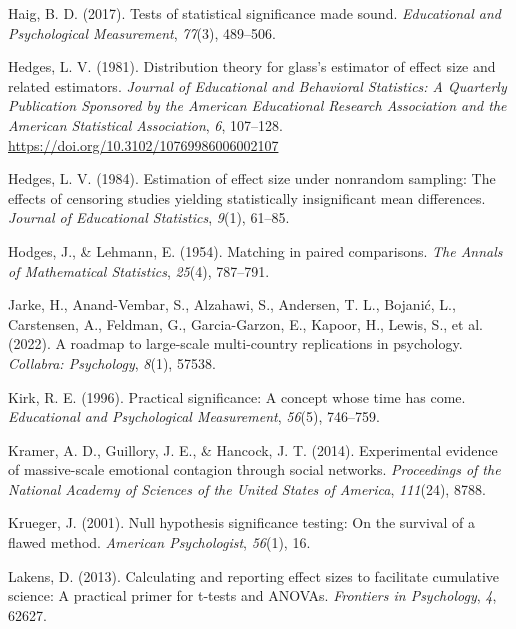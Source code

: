 \documentclass[
  man,floatsintext]{apa7}
\newlength{\cslhangindent}
\newlength{\cslentryspacingunit} %
\newenvironment{CSLReferences}[2] %
 {%
  \setlength{\parindent}{0pt}
  \ifodd #1
  \let\oldpar\par
  \def\par{\hangindent=\cslhangindent\oldpar}
  \fi
  \setlength{\parskip}{#2\cslentryspacingunit}
 }%
 {}
\begin{document}
\begin{CSLReferences}{1}{0}
\leavevmode{}%
Haig, B. D. (2017). Tests of statistical significance made sound. \emph{Educational and Psychological Measurement}, \emph{77}(3), 489--506.

\leavevmode{}%
Hedges, L. V. (1981). Distribution theory for glass's estimator of effect size and related estimators. \emph{Journal of Educational and Behavioral Statistics: A Quarterly Publication Sponsored by the American Educational Research Association and the American Statistical Association}, \emph{6}, 107--128. \url{https://doi.org/10.3102/10769986006002107}

\leavevmode{}%
Hedges, L. V. (1984). Estimation of effect size under nonrandom sampling: The effects of censoring studies yielding statistically insignificant mean differences. \emph{Journal of Educational Statistics}, \emph{9}(1), 61--85.

\leavevmode{}%
Hodges, J., \& Lehmann, E. (1954). Matching in paired comparisons. \emph{The Annals of Mathematical Statistics}, \emph{25}(4), 787--791.

\leavevmode{}%
Jarke, H., Anand-Vembar, S., Alzahawi, S., Andersen, T. L., Bojanić, L., Carstensen, A., Feldman, G., Garcia-Garzon, E., Kapoor, H., Lewis, S., et al. (2022). A roadmap to large-scale multi-country replications in psychology. \emph{Collabra: Psychology}, \emph{8}(1), 57538.

\leavevmode{}%
Kirk, R. E. (1996). Practical significance: A concept whose time has come. \emph{Educational and Psychological Measurement}, \emph{56}(5), 746--759.

\leavevmode{}%
Kramer, A. D., Guillory, J. E., \& Hancock, J. T. (2014). Experimental evidence of massive-scale emotional contagion through social networks. \emph{Proceedings of the National Academy of Sciences of the United States of America}, \emph{111}(24), 8788.

\leavevmode{}%
Krueger, J. (2001). Null hypothesis significance testing: On the survival of a flawed method. \emph{American Psychologist}, \emph{56}(1), 16.

\leavevmode{}%
Lakens, D. (2013). Calculating and reporting effect sizes to facilitate cumulative science: A practical primer for t-tests and ANOVAs. \emph{Frontiers in Psychology}, \emph{4}, 62627.


\end{CSLReferences}
\end{document}
